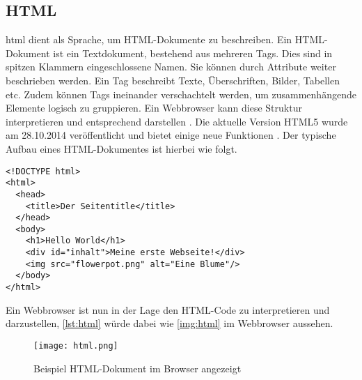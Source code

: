 \subsection{HTML}
\label{html}
\ac{html} dient als Sprache, um HTML-Dokumente zu beschreiben. Ein HTML-Dokument ist ein Textdokument, bestehend aus mehreren Tags. Dies sind in spitzen Klammern eingeschlossene Namen. Sie können durch Attribute weiter beschrieben werden. Ein Tag beschreibt Texte, Überschriften, Bilder, Tabellen etc. Zudem können Tags ineinander verschachtelt werden, um zusammenhängende Elemente logisch zu gruppieren. Ein Webbrowser kann diese Struktur interpretieren und entsprechend darstellen \cite{lub07}. Die aktuelle Version HTML5 wurde am 28.10.2014 veröffentlicht und bietet einige neue Funktionen \cite{W3C2014}. Der typische Aufbau eines HTML-Dokumentes ist hierbei wie folgt.

\begin{lstlisting}[style=htmlcssjs, caption=Beispiel eines HTML-Dokumentes, label=lst:html]
<!DOCTYPE html>
<html>
  <head>
    <title>Der Seitentitle</title>
  </head>
  <body>
    <h1>Hello World</h1>
    <div id="inhalt">Meine erste Webseite!</div>
    <img src="flowerpot.png" alt="Eine Blume"/>
  </body>
</html>
\end{lstlisting}

Ein Webbrowser ist nun in der Lage den HTML-Code zu interpretieren und darzustellen, \autoref{lst:html} würde dabei wie \autoref{img:html} im Webbrowser aussehen.

\begin{figure}[H]
    \begin{center}
        \texttt{[image: html.png]}
        \caption{Beispiel HTML-Dokument im Browser angezeigt}
        \label{img:html}
    \end{center}
\end{figure}